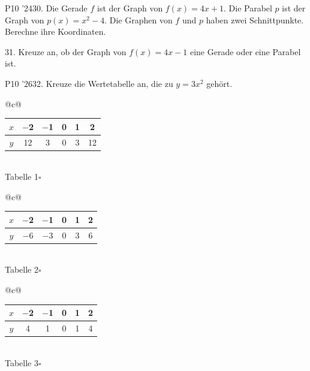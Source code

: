 \documentclass[11pt]{article}
\begin{document}
\pfgruppe{}
\begin{pfaufg}{P10 ’24}{\llap{\textasteriskcentered\,}30.}{}
Die Gerade $f$ ist der Graph von $f(x) = 4x + 1$. Die Parabel $p$ ist der Graph von $p(x) = x^2 - 4$. Die Graphen von $f$ und $p$ haben zwei Schnittpunkte. Berechne ihre Koordinaten.
\end{pfaufg}
\pfgruppe{}
\begin{pfaufg}{}{31.}{}
Kreuze an, ob der Graph von $f(x) = 4x - 1$ eine Gerade oder eine Parabel ist.
\end{pfaufg}
\pfgruppe{}
\begin{pfaufg}{P10 ’26}{32.}{}
Kreuze die Wertetabelle an, die zu $y = 3x^2$ gehört.
\par\smallskip\noindent \begin{tabular}[t]{@{}c@{}}\renewcommand{\arraystretch}{1.3}\begin{tabular}{|c|c|c|c|c|c|}\hline $x$ & $-$2 & $-$1 & 0 & 1 & 2 \\ \hline $y$ & 12 & 3 & 0 & 3 & 12 \\ \hline\end{tabular}\\[3pt]{\small Tabelle 1\enspace$\square$}\end{tabular}\hspace{0.5cm}\begin{tabular}[t]{@{}c@{}}\renewcommand{\arraystretch}{1.3}\begin{tabular}{|c|c|c|c|c|c|}\hline $x$ & $-$2 & $-$1 & 0 & 1 & 2 \\ \hline $y$ & $-$6 & $-$3 & 0 & 3 & 6 \\ \hline\end{tabular}\\[3pt]{\small Tabelle 2\enspace$\square$}\end{tabular}\hspace{0.5cm}\begin{tabular}[t]{@{}c@{}}\renewcommand{\arraystretch}{1.3}\begin{tabular}{|c|c|c|c|c|c|}\hline $x$ & $-$2 & $-$1 & 0 & 1 & 2 \\ \hline $y$ & 4 & 1 & 0 & 1 & 4 \\ \hline\end{tabular}\\[3pt]{\small Tabelle 3\enspace$\square$}\end{tabular}\par
{}
\end{pfaufg}
\end{document}
